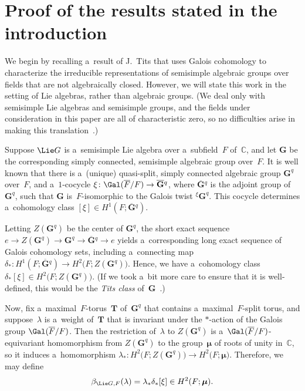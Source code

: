 \section{Proof of the results stated in the introduction}\label{PfSect}

We begin by recalling a~result of J.~Tits that uses Galois cohomology to characterize the irreducible representations of
semisimple algebraic groups over f\/ields that are not algebraically closed.
However, we will state this work in the setting of Lie algebras, rather than algebraic groups.
(We deal only with semisimple Lie algebras and semisimple groups, and the f\/ields under consideration in this paper are
all of characteristic zero, so no dif\/f\/iculties arise in making this translation~\cite[Proposition~7.3.1(iii), p.~393]{DemazureGrothendieck-SGA3}.)

\begin{defn} \label{BetaDefn}
Suppose $\Lie G$ is a~semisimple Lie algebra over a~subf\/ield~$F$ of~$\mathbb{C}$, and let $\mathbf{G}$ be the
corresponding simply connected, semisimple algebraic group over~$F$.
It is well known that there is a~(unique) quasi-split, simply connected algebraic group $\mathbf{G}^q$ over~$F$, and
a~$1$-cocycle $\xi \colon \Gal(\overline{F}/F) \to \overline{\mathbf{G}}{}^q$, where $\overline{\mathbf{G}}{}^q$ is the
adjoint group of~$\mathbf{G}^q$, such that $\mathbf{G}$ is~$F$-isomorphic to the Galois twist ${}^\xi \mathbf{G}^q$.
This cocycle determines a~cohomology class $[\xi] \in H^1(F; \overline{\mathbf{G}}{}^q)$.

Letting $Z(\mathbf{G}^q)$ be the center of $\mathbf{G}^q$, the short exact sequence $ e \to Z(\mathbf{G}^q) \to
\mathbf{G}^q \to \overline{\mathbf{G}}{}^q \to e $ yields a~corresponding long exact sequence of Galois cohomology sets,
including a~connecting map $\delta_* \colon H^1(F; \overline{\mathbf{G}}{}^q) \to H^2\bigl(F; Z(\mathbf{G}^q) \bigr)$.
Hence, we have a~cohomology class $\delta_* [\xi] \in H^2\bigl(F; Z(\mathbf{G}^q) \bigr)$.
(If we took a~bit more care to ensure that it is well-def\/ined, this would be the \emph{Tits class}
of~$\mathbf{G}$~\cite[p.~426]{KnusEtAl-BookOfInvols}.)

Now, f\/ix a~maximal~$F$-torus~$\mathbf{T}$ of~$\mathbf{G}^q$ that contains a~maximal~$F$-split torus, and
suppose~$\lambda$ is a~weight of~$\mathbf{T}$ that is invariant under the $*$-action of the Galois group $\Gal(\overline{F}/F)$.
Then the restriction of~$\lambda$ to $Z(\mathbf{G}^q)$ is a~$\Gal(\overline{F}/F)$-equivariant homomorphism from
$Z(\mathbf{G}^q)$ to the group~$\boldsymbol\mu$ of roots of unity in~$\mathbb{C}$, so it induces a~homomorphism
$\lambda_* \colon H^2\bigl(F; Z(\mathbf{G}^q) \bigr) \to H^2\bigl(F; \boldsymbol\mu \bigr)$.
Therefore, we may def\/ine
\begin{gather*}
\beta_{\Lie G,F}(\lambda) = \lambda_* \delta_* [\xi] \in H^2(F; \boldsymbol\mu).
\end{gather*}
\end{defn}

